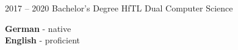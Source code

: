 \documentclass[9pt]{cvstyle}
\begin{document}

\begin{entrylist}
	\entry
		{2017 -- 2020}
		{Bachelor's Degree}
		{HfTL Dual Computer Science}
		{\lorem\lorem}
\end{entrylist}

\begin{minipage}[t]{0.3\textwidth}
	\vspace{-\baselineskip} 

	
	\textbf{German} - native\\
	\textbf{English} - proficient
\end{minipage}
\hfill
\end{document}
